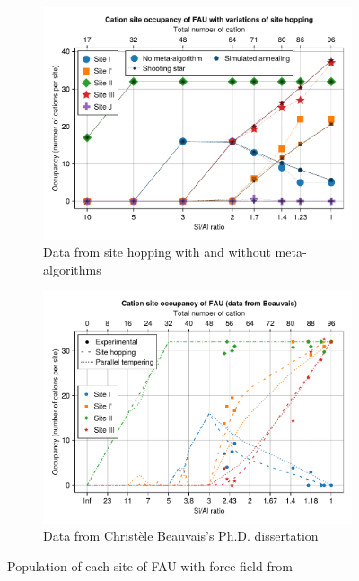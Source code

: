 \documentclass[main.tex]{subfiles}
\begin{document}
\begin{figure}
	\centering
	\begin{subfigure}{0.9\linewidth}
		\centering
		\includegraphics[width=\linewidth]{figures/cations/FAUJeffroyFF_varationssitehopping.pdf}
		\caption{Data from site hopping with and without meta-algorithms}\label{fig:sitehopping_jeffroyFF}
	\end{subfigure}
	
	\begin{subfigure}{0.9\linewidth}
		\centering
		\includegraphics[width=\linewidth]{figures/cations/christele.pdf}
		\caption{Data from Christèle Beauvais's Ph.D. dissertation}\label{fig:christele}
	\end{subfigure}
	
	\caption{Population of each site of FAU with force field from \textcite{DiLellaFF}}
\end{figure}
\end{document}
